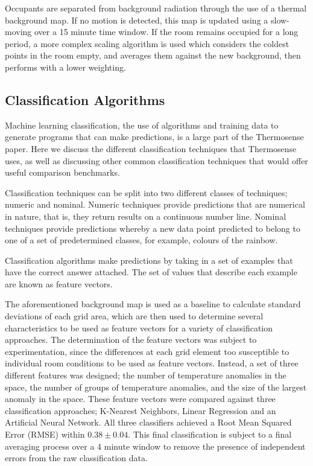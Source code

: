 \documentclass[../thesis/thesis.tex]{subfiles}
\begin{document}
Occupants are separated from background radiation through the use of a thermal background map. If no motion is detected, this map is updated using a slow-moving \emwa over a 15 minute time window. If the room remains occupied for a long period, a more complex scaling algorithm is used which considers the coldest points in the room empty, and averages them against the new background, then performs \emwa with a lower weighting.

\subsection{Classification Algorithms}
Machine learning classification, the use of algorithms and training data to generate programs that can make predictions, is a large part of the Thermosense paper. Here we discuss the different classification techniques that Thermosense uses, as well as discussing other common classification techniques that would offer useful comparison benchmarks.

Classification techniques can be split into two different classes of techniques; numeric and nominal. Numeric techniques provide predictions that are numerical in nature, that is, they return results on a continuous number line. Nominal techniques provide predictions whereby a new data point predicted to belong to one of a set of predetermined classes, for example, colours of the rainbow.

Classification algorithms make predictions by taking in a set of examples that have the correct answer attached. The set of values that describe each example are known as feature vectors.

The aforementioned background map is used as a baseline to calculate standard deviations of each grid area, which are then used to determine several characteristics to be used as feature vectors for a variety of classification approaches. The determination of the feature vectors was subject to experimentation, since the differences at each grid element too susceptible to individual room conditions to be used as feature vectors. Instead, a set of three different features was designed; the number of temperature anomalies in the space, the number of groups of temperature anomalies, and the size of the largest anomaly in the space. These feature vectors were compared against three classification approaches; K-Nearest Neighbors, Linear Regression and an Artificial Neural Network. All three classifiers achieved a Root Mean Squared Error (RMSE) within $0.38\pm0.04$. This final classification is subject to a final averaging process over a 4 minute window to remove the presence of independent errors from the raw classification data.
\end{document}
